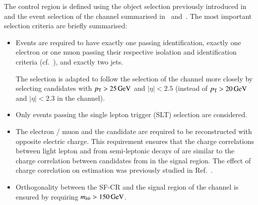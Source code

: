 The control region is defined using the object selection previously
introduced in~ and the event selection
of the \lephad channel summarised in~
and~. The most important selection criteria
are briefly summarised:
\begin{itemize}

\item Events are required to have exactly one \tauhadvis passing
  identification, exactly one electron or one muon passing their
  respective isolation and identification criteria
  (cf.~), and exactly two \btagged jets.

  The \tauhadvis selection is adapted to follow the selection of the
  \hadhad channel more closely by selecting \tauhadvis candidates with
  $p_{\text{T}} > \SI{25}{\ensuremath{\text{GeV}}}$ and $|\eta| < \num{2.5}$ (instead of
  $\pT > \SI{20}{\GeV}$ and $|\eta| < \num{2.3}$ in the \lephad
  channel).

\item Only events passing the single lepton trigger (SLT) selection
  are considered.

\item The electron / muon and the \tauhadvis candidate are required to
  be reconstructed with opposite electric charge. This requirement
  ensures that the charge correlations between light lepton and
  \faketauhadvis from semi-leptonic decays of \ttbar are similar to
  the charge correlation between \tauhadvis candidates from
  \ttbarFakes in the \hadhad signal region. The effect of charge
  correlation on \ttbarFakes estimation was previously studied in
  Ref.~\cite{bokan}.

\item Orthogonality between the SF-CR and the signal region of the
  \lephad channel is ensured by requiring $m_{bb} > \SI{150}{\ensuremath{\text{GeV}}}$.

\end{itemize}


